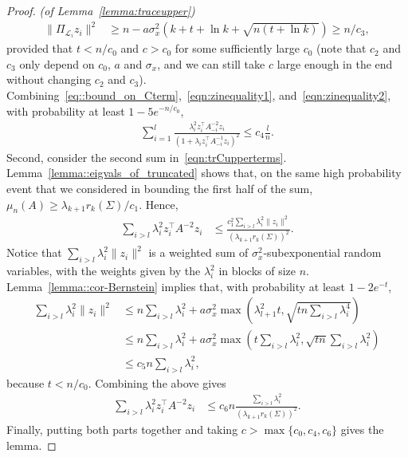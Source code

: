 \documentclass[11pt,notitlepage]{article}
\newcommand\Ls {\mathscr{L}}
\begin{document}
\begin{proof}{\em (of Lemma~\ref{lemma:traceupper})}
\begin{align}
        \|\Pi_{\Ls_i}z_i\|^2
          & \geq n-a\sigma_x^2(k + t + \ln k + \sqrt{n(t + \ln k)}) \ge n/c_3,        \label{eqn:zinequality2}
      \end{align}
    provided that  $t < n/c_0$ and $c > c_0$ for some sufficiently
    large $c_0$ (note that $c_2$ and $c_3$ only depend on $c_0$, $a$
    and $\sigma_x$, and we can still take $c$ large enough in the end
    without changing $c_2$ and $c_3$).
    Combining~\eqref{eq::bound_on_Cterm},~\eqref{eqn:zinequality1},
    and~\eqref{eqn:zinequality2}, with probability at least
   $1-5e^{-n/c_0}$,
      \begin{align*}
        \sum_{i=1}^l\frac{\lambda_i^2 z_i^\top
            A_{-i}^{-2}z_i}{(1 + \lambda_i z_i^\top A_{-i}^{-1}z_i)^2}
          \leq c_4\frac{l}{n}.
      \end{align*}
    Second, consider the second sum in~\eqref{eqn:trCupperterms}.
    Lemma~\ref{lemma::eigvals_of_truncated} shows that, on the same high
    probability event that we considered in bounding the first half of the sum,
    $\mu_n(A)\ge\lambda_{k+1}r_k(\Sigma)/c_1$. Hence,
      \begin{align*}
        \sum_{i>l}\lambda_i^2 z_i^\top A^{-2}z_i
          &\le \frac{c_1^2\sum_{i>l}\lambda_i^2\|z_i\|^2}
            {\left(\lambda_{k+1}r_k(\Sigma)\right)^2}.
      \end{align*}
    Notice that $\sum_{i>l}\lambda_i^2\|z_i\|^2$ is a weighted sum of $\sigma_x^2$-subexponential random
    variables, with the weights given by the $\lambda_i^2$ in blocks of size $n$.
    Lemma~\ref{lemma::cor-Bernstein} implies that, with probability at least $1-2e^{-t}$,
      \begin{align*}
        \sum_{i>l}\lambda_i^2\|z_i\|^2
          & \le n\sum_{i>l}\lambda_i^2
            + a\sigma_x^2\max\left(\lambda_{l+1}^2t,
            \sqrt{tn\sum_{i>l}\lambda_i^4}\right) \\
          & \le n\sum_{i>l}\lambda_i^2
            + a\sigma_x^2\max\left(t\sum_{i>l}\lambda_i^2,
            \sqrt{tn}\sum_{i>l}\lambda_i^2\right) \\
          & \le c_5n\sum_{i>l}\lambda_i^2,
      \end{align*}
    because $t < n/c_0$. Combining the above gives
      \begin{align*}
        \sum_{i>l}\lambda_i^2 z_i^\top A^{-2}z_i
          &\le c_{6}n\frac{\sum_{i>l}\lambda_i^2}{\left(\lambda_{k+1}r_k(\Sigma)\right)^2}.
      \end{align*}
     Finally, putting both parts together and taking $c > \max\{c_0,
     c_4, c_6\}$ gives the lemma.
\end{proof}
\end{document}
